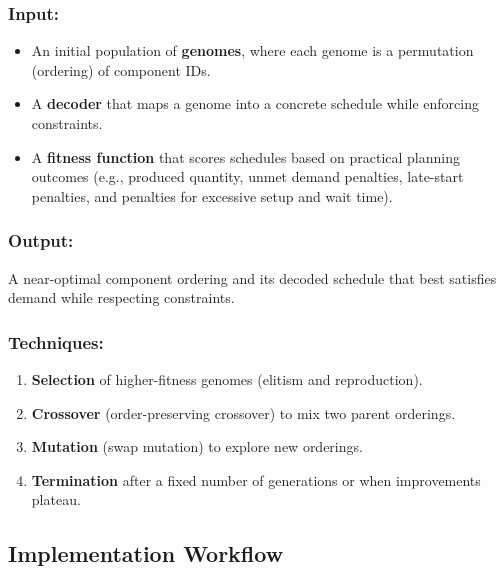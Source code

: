 \subsubsection*{Input:}
\begin{itemize}
    \item An initial population of \textbf{genomes}, where each genome is a permutation (ordering) of component IDs.
    \item A \textbf{decoder} that maps a genome into a concrete schedule while enforcing constraints.
    \item A \textbf{fitness function} that scores schedules based on practical planning outcomes (e.g., produced quantity, unmet demand penalties, late-start penalties, and penalties for excessive setup and wait time).
\end{itemize}

\subsubsection*{Output:}
A near-optimal component ordering and its decoded schedule that best satisfies demand while respecting constraints.

\subsubsection*{Techniques:}
\begin{enumerate}
    \item \textbf{Selection} of higher-fitness genomes (elitism and reproduction).
    \item \textbf{Crossover} (order-preserving crossover) to mix two parent orderings.
    \item \textbf{Mutation} (swap mutation) to explore new orderings.
    \item \textbf{Termination} after a fixed number of generations or when improvements plateau.
\end{enumerate}

\subsection{Implementation Workflow}

